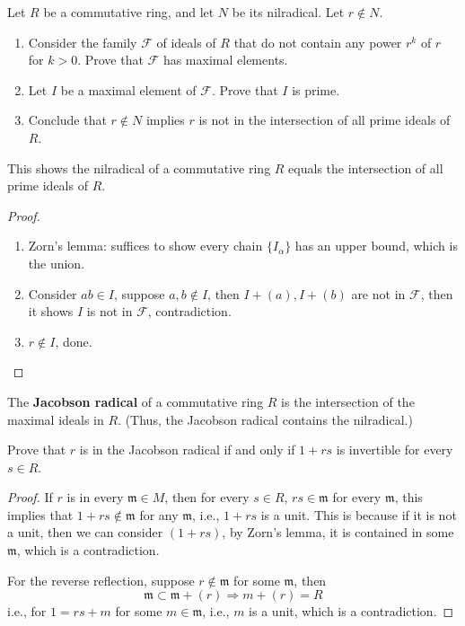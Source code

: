 \documentclass[openany]{book}
\begin{document}
\begin{prob}[3.13]
    Let \( R \) be a commutative ring, and let \( N \) be its nilradical. Let \( r \notin N \).

\begin{enumerate}
    \item Consider the family \( \mathcal{F} \) of ideals of \( R \) that do not contain any power \( r^k \) of \( r \) for \( k > 0 \). Prove that \( \mathcal{F} \) has maximal elements.
    
    \item Let \( I \) be a maximal element of \( \mathcal{F} \). Prove that \( I \) is prime.
    
    \item Conclude that \( r \notin N \) implies \( r \) is not in the intersection of all prime ideals of \( R \).
\end{enumerate}

This shows the nilradical of a commutative ring \( R \) equals the intersection of all prime ideals of \( R \).
\end{prob}
\begin{proof}
    \begin{enumerate}
        \item Zorn's lemma: suffices to show every chain $\{I_\alpha\}$ has an upper bound, which is the union.
        \item Consider $ab\in I$, suppose $a,b\not\in I$, then $I+(a), I+(b)$ are not in $\mathcal{F}$, then it shows $I$ is not in $\mathcal{F}$, contradiction.
        \item $r\not\in I$, done.
    \end{enumerate}
\end{proof}



\begin{prob}[3.14]
    The \textbf{Jacobson radical} of a commutative ring \( R \) is the intersection of the maximal ideals in \( R \). (Thus, the Jacobson radical contains the nilradical.) 

Prove that \( r \) is in the Jacobson radical if and only if \( 1 + rs \) is invertible for every \( s \in R \).
\end{prob}
\begin{proof}
    If $r$ is in every $\mathfrak{m}\in M$, then for every $s\in R$, $rs\in\mathfrak{m}$ for every $\mathfrak{m}$, this implies that $1+rs\not\in\mathfrak{m}$ for any $\mathfrak{m}$, i.e., $1+rs$ is a unit. This is because if it is not a unit, then we can consider $(1+rs)$, by Zorn's lemma, it is contained in some $\mathfrak{m}$, which is a contradiction. 

    For the reverse reflection, suppose $r\not\in\mathfrak{m}$ for some $\mathfrak{m}$, then 
    \begin{equation*}
        \mathfrak{m}\subset \mathfrak{m}+(r)\Rightarrow m+(r)=R
    \end{equation*}
    i.e., for $1=rs+m$ for some $m\in\mathfrak{m}$, i.e., $m$ is a unit, which is a contradiction.
\end{proof}
\end{document}
